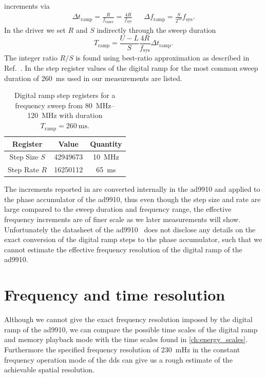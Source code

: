 increments via
\begin{align}
  \Delta t_\text{ramp}=\frac{R}{f_\text{timer}}=\frac{4R}{f_\text{sys}} &&
  \Delta f_\text{ramp}=\frac{S}{2^{32}}f_\text{sys}
  \label{eq:dds_dramp_steps}.
\end{align}
In the driver we set $R$ and $S$ indirectly through the sweep duration
\begin{equation}
  T_\text{ramp}
  =
  \frac{U-L}{S}\frac{4R}{f_\text{sys}}
  \Delta t_\text{ramp}
  \label{eq:dds_dramp_duration}.
\end{equation}
The integer ratio $R/S$ is found using best-ratio approximation as described
in Ref.~\cite{Ashley2003}. In  the step register
values of the digital ramp for the most common sweep duration of
\SI{260}{\milli\second} used in our measurements are listed.
\begin{table}[htb]
  \centering
  \begin{tabular}{ccc}
    \toprule
    Register & Value & Quantity \\
    \midrule
    Step Size $S$ & \num{42949673} & \SI{10}{\mega\hertz} \\
    Step Rate $R$ & \num{16250112} & \SI{65}{\milli\second} \\
    \bottomrule
  \end{tabular}
  \caption{Digital ramp step registers for a frequency sweep from
    \SIrange{80}{120}{\mega\hertz} with duration
    $T_\text{ramp}=\SI{260}{\milli\second}$.
  }\label{tab:dds_dramp_steps}
\end{table}
The increments reported in  are converted
internally in the \gls{ad9910} and applied to the phase accumulator of the
\gls{ad9910}, thus even though the step size and rate are large compared to
the sweep duration and frequency range, the effective frequency increments
are of finer scale as we later measurements will show. Unfortunately the
datasheet of the \gls{ad9910}~\cite{AD9910} does not disclose any details on
the exact conversion of the digital ramp steps to the phase accumulator,
such that we cannot estimate the effective frequency resolution of the digital
ramp of the \gls{ad9910}.

\section{Frequency and time resolution}

Although we cannot give the exact frequency resolution imposed by the digital
ramp of the \gls{ad9910}, we can compare the possible time scales of the
digital ramp and memory playback mode with the time scales found in
\cref{ch:energy_scales}. Furthermore the specified frequency resolution
of \SI{230}{\milli\hertz} in the constant frequency operation mode of the
\gls{dds} can give us a rough estimate of the achievable spatial resolution.


